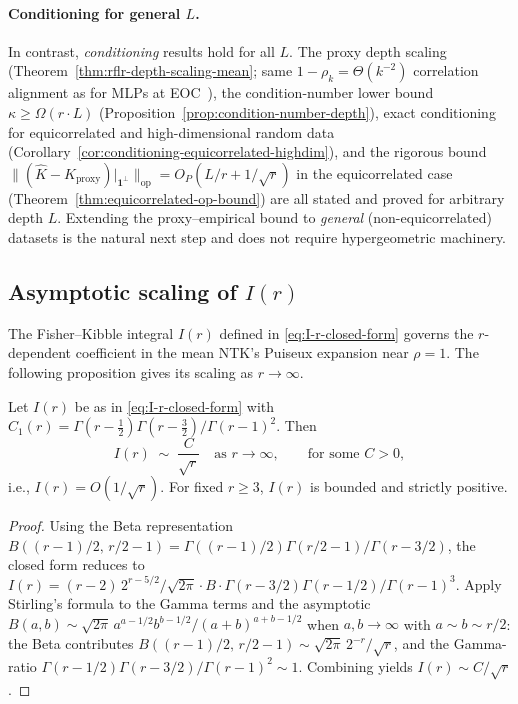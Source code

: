 \paragraph{Conditioning for general \(L\).}
In contrast, \emph{conditioning} results hold for all \(L\). The proxy depth scaling (Theorem~\ref{thm:rflr-depth-scaling-mean}; same \(1-\rho_k=\Theta(k^{-2})\) correlation alignment as for MLPs at EOC~\cite{terjek2025mlpsateoc,pmlr-v163-hayou22a}), the condition-number lower bound \(\kappa\ge\Omega(r\cdot L)\) (Proposition~\ref{prop:condition-number-depth}), exact conditioning for equicorrelated and high-dimensional random data (Corollary~\ref{cor:conditioning-equicorrelated-highdim}), and the rigorous bound \(\|(\hat{K}-K_{\mathrm{proxy}})|_{\mathbf{1}^\perp}\|_{\mathrm{op}}=O_P(L/r+1/\sqrt{r})\) in the equicorrelated case (Theorem~\ref{thm:equicorrelated-op-bound}) are all stated and proved for arbitrary depth \(L\). Extending the proxy--empirical bound to \emph{general} (non-equicorrelated) datasets is the natural next step and does not require hypergeometric machinery.

\subsection{\texorpdfstring{Asymptotic scaling of \( I(r) \)}{Asymptotic scaling of I(r)}}\label{appendix:I-r-scaling}
The Fisher--Kibble integral \( I(r) \) defined in \eqref{eq:I-r-closed-form} governs the \( r \)-dependent coefficient in the mean NTK's Puiseux expansion near \( \rho=1 \). The following proposition gives its scaling as \( r \to \infty \).

\begin{proposition}\label{prop:I-r-scaling-appendix}
Let \( I(r) \) be as in \eqref{eq:I-r-closed-form} with \( C_1(r) = \Gamma(r-\tfrac{1}{2})\Gamma(r-\tfrac{3}{2})/\Gamma(r-1)^2 \). Then
\begin{equation}
I(r) \;\sim\; \frac{C}{\sqrt{r}} \quad \text{as } r\to\infty,\qquad \text{for some } C > 0,
\end{equation}
i.e., \( I(r) = O(1/\sqrt{r}) \). For fixed \( r \ge 3 \), \( I(r) \) is bounded and strictly positive.
\end{proposition}
\begin{proof}
Using the Beta representation \( B((r-1)/2,\,r/2-1) = \Gamma((r-1)/2)\Gamma(r/2-1)/\Gamma(r-3/2) \), the closed form reduces to \( I(r) = (r-2)\,2^{r-5/2}/\sqrt{2\pi} \cdot B \cdot \Gamma(r-3/2)\Gamma(r-1/2)/\Gamma(r-1)^3 \). Apply Stirling's formula to the Gamma terms and the asymptotic \( B(a,b) \sim \sqrt{2\pi}\,a^{a-1/2}b^{b-1/2}/(a+b)^{a+b-1/2} \) when \( a,b \to \infty \) with \( a \sim b \sim r/2 \): the Beta contributes \( B((r-1)/2,\,r/2-1) \sim \sqrt{2\pi}\,2^{-r}/\sqrt{r} \), and the Gamma-ratio \( \Gamma(r-1/2)\Gamma(r-3/2)/\Gamma(r-1)^2 \sim 1 \). Combining yields \( I(r) \sim C/\sqrt{r} \).
\end{proof}

